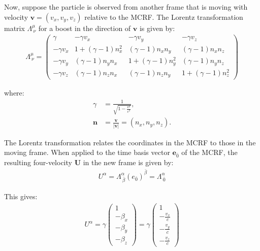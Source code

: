 \documentclass[11pt,letterpaper]{book}
\begin{document}
            Now, suppose the particle is observed from another frame that is moving with velocity \( \mathbf{v} = (v_x, v_y, v_z) \) relative to the MCRF. The Lorentz transformation matrix \( \Lambda^\mu_{\ \nu} \) for a boost in the direction of \( \mathbf{v} \) is given by:
            \begin{align}
            \Lambda^\mu_{\ \nu} =
            \begin{pmatrix}
            \gamma & -\gamma v_x & -\gamma v_y & -\gamma v_z \\
            -\gamma v_x & 1 + (\gamma - 1)n_x^2 & (\gamma - 1)n_x n_y & (\gamma - 1)n_x n_z \\
            -\gamma v_y & (\gamma - 1)n_y n_x & 1 + (\gamma - 1)n_y^2 & (\gamma - 1)n_y n_z \\
            -\gamma v_z & (\gamma - 1)n_z n_x & (\gamma - 1)n_z n_y & 1 + (\gamma - 1)n_z^2
            \end{pmatrix}
            \end{align}
            
            where:
            \begin{align*}
            \gamma &= \frac{1}{\sqrt{1 - \frac{v^2}{c^2}}}, \\
            \mathbf{n} &= \frac{\mathbf{v}}{|\mathbf{v}|} = (n_x, n_y, n_z).
            \end{align*}
            
            The Lorentz transformation relates the coordinates in the MCRF to those in the moving frame. When applied to the time basis vector \( \mathbf{e}_{\bar{0}} \) of the MCRF, the resulting four-velocity \( \mathbf{U} \) in the new frame is given by:  
            \begin{align}
            U^\alpha = \Lambda^\alpha_{\ \bar{\beta}} (e_{\bar{0}})^{\bar{\beta}} = \Lambda^\alpha_{\ \bar{0}}
            \end{align}
            
            This gives:
            \begin{align}
            U^\alpha = \gamma \begin{pmatrix} 1 \\ -\beta_x \\ -\beta_y \\ -\beta_z \end{pmatrix} 
            = \gamma \begin{pmatrix} 1 \\ -\frac{v_x}{c} \\ -\frac{v_y}{c} \\ -\frac{v_z}{c} \end{pmatrix}
            \end{align}
            
\end{document}

